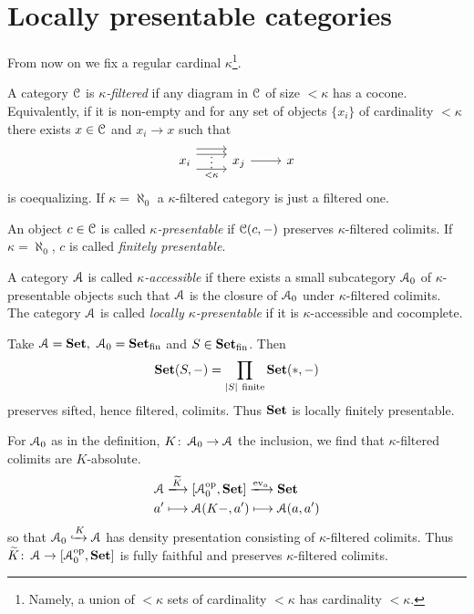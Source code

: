 \documentclass[a4paper,11pt,oneside,openany]{scrbook}
\begin{document}
\section{Locally presentable categories}
From now on we fix a regular cardinal $\kappa$\footnote{Namely, a union of $<\kappa$ sets of cardinality $<\kappa$ has cardinality $<\kappa$.}.
\begin{defn}
	A category $\operatorname{\mathcal{C}}$ is \emph{$\kappa$-filtered} if any diagram in $\operatorname{\mathcal{C}}$ of size $<\kappa$ has a cocone. Equivalently, if it is non-empty and for any set of objects $\{x_i\}$ of cardinality $<\kappa$ there exists $x\in\operatorname{\mathcal{C}}$ and $x_i\to x$ such that
	\[
		\begin{tikzcd}
			x_i\arrow[r,shift left=2.2ex] \arrow[r,shift left=1.2ex,""{name=A}] \arrow[r, shift right=1.5ex,"<\kappa"',""{name=B}]\ar[from=A, to=B, phantom, "\vdots"]&x_j \arrow[r]&x
		\end{tikzcd}
	\]
	is coequalizing. If $\kappa=\aleph_0$ a $\kappa$-filtered category is just a filtered one.
\end{defn}
\begin{defn}
	An object $c\in\operatorname{\mathcal{C}}$ is called \emph{$\kappa$-presentable} if $\operatorname{\mathcal{C}}(c,-)$ preserves $\kappa$-filtered colimits. If $\kappa=\aleph_0$, $c$ is called \emph{finitely presentable}.
\end{defn}
\begin{defn}
	A category $\operatorname{\mathcal{A}}$ is called \emph{$\kappa$-accessible} if there exists a small subcategory $\operatorname{\mathcal{A}}_0$ of $\kappa$-presentable objects such that $\operatorname{\mathcal{A}}$ is the closure of $\operatorname{\mathcal{A}}_0$ under $\kappa$-filtered colimits. The category $\operatorname{\mathcal{A}}$ is called \emph{locally $\kappa$-presentable} if it is $\kappa$-accessible and cocomplete.
\end{defn}
\begin{exmp}
	Take $\A=\Set,\ \A_0=\Set_\text{fin}$ and $S\in{\normalfont\textbf{Set}}_\text{fin}$. Then $$\Set(S,-)=\displaystyle\prod_{|S| \ \text{finite}}\Set(*,-)$$
	preserves sifted, hence filtered, colimits. Thus ${\normalfont\textbf{Set}}$ is locally finitely presentable.
\end{exmp}
\begin{rmk}
	For $\operatorname{\mathcal{A}}_0$ as in the definition, $K\colon\operatorname{\mathcal{A}}_0\to\operatorname{\mathcal{A}}$ the inclusion, we find that $\kappa$-filtered colimits are $K$-absolute.
	\begin{align*}
		\A & \xlongrightarrow{\widetilde{K}}\left[\A_0^{\op},\Set\right]\xlongrightarrow{\text{ev}_a}\Set \\
		a' & \longmapsto\A(K-,a')\longmapsto\A(a,a')
	\end{align*}
	so that $\operatorname{\mathcal{A}}_0\xhookrightarrow{K}\operatorname{\mathcal{A}}$ has density presentation consisting of $\kappa$-filtered colimits. Thus $\widetilde{K}\colon\operatorname{\mathcal{A}}\to\left[\operatorname{\mathcal{A}}_0^{\operatorname{\text{op}}},{\normalfont\textbf{Set}}\right]$ is fully faithful and preserves $\kappa$-filtered colimits.
\end{rmk}
\end{document}

